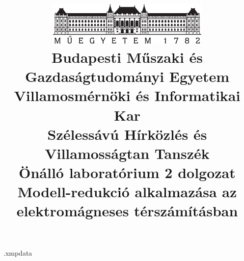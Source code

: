 \begin{filecontents*}[overwrite]{\jobname.xmpdata}
\end{filecontents*}

\documentclass[a4paper,12pt,titlepage]{article}
\usepackage{ucs}
\usepackage[T1]{fontenc}
\usepackage[utf8]{inputenc}
\usepackage[magyar]{babel}
\usepackage{amsfonts}
\usepackage{amsmath,bm}
\usepackage{graphicx}
\usepackage{siunitx}
\usepackage[left=20mm,right=20mm,top=20mm,bottom=25mm]{geometry}
\usepackage{hyperref}
\usepackage{xcolor}
\usepackage[a-3u]{pdfx}

\sloppy %
\def\hyph{-\penalty0\hskip0pt\relax} %

\pagestyle{plain} 

\listfiles %

\title{
    \centering
    \includegraphics[width=0.6\textwidth]{kep/bme_logo.pdf} \\
    \vspace{0.5cm}
    \large{\bf Budapesti Műszaki és Gazdaságtudományi Egyetem \\
    Villamosmérnöki és Informatikai Kar \\
    Szélessávú Hírközlés és Villamosságtan Tanszék}\\
    \vspace{4cm}
    \large{Önálló laboratórium 2 dolgozat} \\
    \vspace{2cm}
    \Large{\bf{Modell-redukció alkalmazása az elektromágneses térszámításban}} \\
    \vspace{2cm}
}

